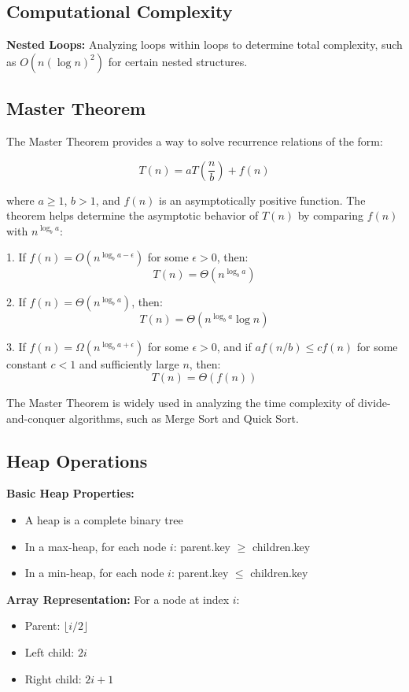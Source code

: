 \subsection{Computational Complexity}
\textbf{Nested Loops:} Analyzing loops within loops to determine total complexity, such as $O(n(\log n)^2)$ for certain nested structures.

\subsection{Master Theorem}
The Master Theorem provides a way to solve recurrence relations of the form:

\[ T(n) = aT\left(\frac{n}{b}\right) + f(n) \]

where $a \geq 1$, $b > 1$, and $f(n)$ is an asymptotically positive function. The theorem helps determine the asymptotic behavior of $T(n)$ by comparing $f(n)$ with $n^{\log_b a}$:

1. If $f(n) = O(n^{\log_b a - \epsilon})$ for some $\epsilon > 0$, then:
   \[ T(n) = \Theta(n^{\log_b a}) \]

2. If $f(n) = \Theta(n^{\log_b a})$, then:
   \[ T(n) = \Theta(n^{\log_b a} \log n) \]

3. If $f(n) = \Omega(n^{\log_b a + \epsilon})$ for some $\epsilon > 0$, and if $af(n/b) \leq cf(n)$ for some constant $c < 1$ and sufficiently large $n$, then:
   \[ T(n) = \Theta(f(n)) \]

The Master Theorem is widely used in analyzing the time complexity of divide-and-conquer algorithms, such as Merge Sort and Quick Sort.

\subsection{Heap Operations}
\textbf{Basic Heap Properties:}
\begin{itemize}
    \item A heap is a complete binary tree
    \item In a max-heap, for each node $i$: parent.key $\geq$ children.key
    \item In a min-heap, for each node $i$: parent.key $\leq$ children.key
\end{itemize}

\textbf{Array Representation:}
For a node at index $i$:
\begin{itemize}
    \item Parent: $\lfloor i/2 \rfloor$
    \item Left child: $2i$
    \item Right child: $2i + 1$
\end{itemize}

